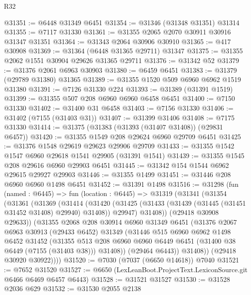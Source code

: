 \begin{lexlean}{R32}
\begin{coremodule}
@31351 := @6448 @31349 @6451
@31354 := @31346 (@31348 @31351) @31314
@31355 := @7117 @31330
@31361 := @31355 @2065 @2070 @30911 @30916 @31347 @31351
@31364 := @31343 @2064 @30906 @30910
@31365 := @417 @30908
@31369 := @31364 (@6448 @31365 @29711) @31347
@31375 := @31355 @2062 @1551 @30904 @29626 @31365 @29711
@31376 := @31342 @52
@31379 := @31376 @2061 @6963 @30903
@31380 := @6459 @6451
@31383 := @31379 (@29789 @31380) @31365
@31389 := @31355 @1520 @509 @6960 @6962 @1519 @31380
@31391 := @7126 @31330 @224
@31393 := @31389 (@31391 @1519)
@31399 := @31355 @507 @208 @6960 @6960 @6458 @6451
@31400 := @7150 @31330
@31402 := @31400 @31 @6458
@31403 := @7156 @31330
@31406 := @31402 (@7155 (@31403 @31))
@31407 := @31399 @31406
@31408 := @7175 @31330
@31414 := @31375 (@31383 (@31393 (@31407 @31408)) (@29831 @6457))
@31420 := @31355 @1549 @208 @29624 @6960 @29709 @6451
@31425 := @31376 @1548 @29619 @29623 @29906 @29709
@31433 := @31355 @1542 @1547 @6960 @29618 @1541 @29905 (@31391 @1541)
@31439 := @31355 @1545 @208 @29616 @6960 @29903 @6451
@31445 := @31342 @154 @1544 @6962 @29615 @29927 @29903
@31446 := @31355 @1499
@31451 := @31446 @208 @6960 @6960 @1498 @6451
@31452 := @31391 @1498
@31516 := @31298
    (fun (named : @6445) =>
    fun (location : @6445) =>
    @31319
      (@31341
        (@31354
          (@31361
            (@31369
              (@31414
                (@31420
                  (@31425 (@31433 (@31439 (@31445 (@31451 @31452 @31408) @29940) @31408)) @29947)
                  @31408))
              (@29418 @30908 @29633))
            (@31355
              @2068
              @208
              @30914
              @6960
              @31349
              @6451
              (@31376
                @2067
                @6963
                @30913
                (@29433 @6452)
                @31349
                (@31446
                  @515
                  @6960
                  @6962
                  @1498
                  @6452
                  @31452
                  (@31355
                    @513
                    @208
                    @6960
                    @6960
                    @6449
                    @6451
                    (@31400 @38 @6449 (@7155 (@31403 @38)))
                    @31408))
                (@29464 @6443))
              @31408))
          (@29418 @30920 @30922))))
@31520 := @7030 (@7037 (@6650 @14618)) @7040
@31521 := @7652 @31520
@31527 := @6650 (LexLeanBoot.ProjectText.LexiconSource.git @6466 @6469 @6457 @6443)
@31528 := @31521 @31527
@31530 := @31528 @2036 @629
@31532 := @31530 @2055 @2138

\end{coremodule}
\end{lexlean}

